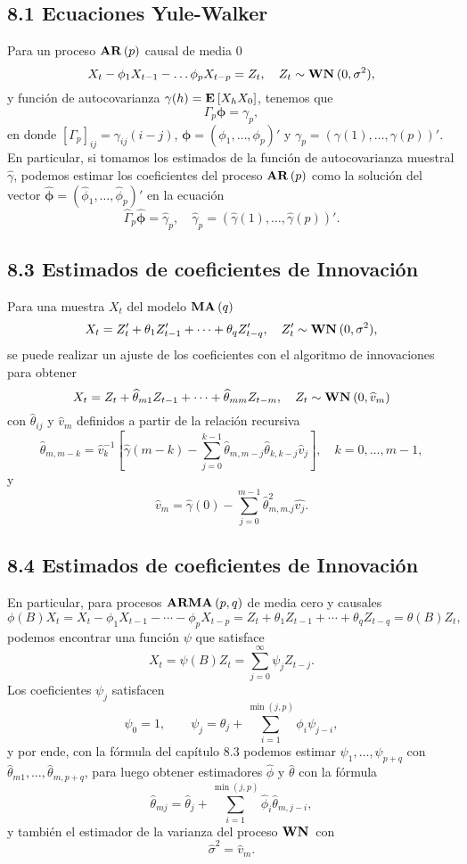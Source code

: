 \documentclass[11pt]{article}
\def\E{\ensuremath{\textbf{E\,}}}
\def\WN{\ensuremath{\textbf{WN\,}}}
\def\AR{\ensuremath{\textbf{AR\,}}}
\def\MA{\ensuremath{\textbf{MA\,}}}
\def\ARMA{\ensuremath{\textbf{ARMA\,}}}
\theoremstyle{definition}
\newcommand\wh[1]{\widehat{#1}}
\begin{document}
\subsection*{8.1 Ecuaciones Yule-Walker}

Para un proceso $\AR(p)$ causal de media 0
\[ X_t -\phi_1 X_{t-1} - \ldots \phi_{p} X_{t-p} = Z_t,\quad Z_t \sim \WN(0,\sigma^2), \]
y función de autocovarianza $\gamma(h) = \E[X_h X_0]$, tenemos que
\[ \Gamma_p \bm{\phi} = \gamma_p, \]
en donde $[\Gamma_p]_{ij} = \gamma_{ij}(i-j)$, $\bm{\phi} = (\phi_1,\ldots, \phi_p)'$ y $\gamma_p = (\gamma(1),\ldots, \gamma(p))'$. En particular, si tomamos los estimados de la función de autocovarianza muestral $\wh\gamma$, podemos estimar los coeficientes del proceso $\AR(p)$ como la solución del vector $\wh{\bm{\phi}} = (\wh{\phi}_1,\ldots,\wh{\phi}_p)'$ en la ecuación
\[ \wh{\Gamma}_p \wh{\bm{\phi}} = \wh{\gamma}_p,\quad \wh\gamma_p = (\wh\gamma(1),\ldots, \wh\gamma(p))'. \]


\subsection*{8.3 Estimados de coeficientes de Innovación}

Para una muestra $X_t$ del modelo $\MA(q)$
\[ X_t = Z_t' + \theta_1 Z_{t-1}' + \cdots + \theta_q Z_{t-q}',\quad Z_t' \sim \WN(0,\sigma^2), \]
se puede realizar un ajuste de los coeficientes con el algoritmo de innovaciones para obtener
\[ X_t = Z_t + \wh{\theta}_{m1} Z_{t-1} + \cdots + \wh{\theta}_{mm} Z_{t-m},\quad Z_t \sim \WN(0,\wh{v}_m) \]
con $\wh\theta_{ij}$ y $\wh{v}_m$ definidos a partir de la relación recursiva
\[ \wh{\theta}_{m,m-k} = \wh{v}_k^{-1}\left[  \wh{\gamma}(m-k) - \sum_{j = 0}^{k-1} \wh{\theta}_{m,m-j} \wh{\theta}_{k,k-j} \wh{v}_j \right],\quad k = 0,\ldots, m-1, \]
y
\[ \wh{v}_m = \wh{\gamma}(0) - \sum_{j = 0}^{m-1} \wh{\theta}_{m,m.j}^2 \wh{v_j}. \]

\subsection*{8.4 Estimados de coeficientes de Innovación}

En particular, para procesos $\ARMA(p,q)$ de media cero y causales
\[ \phi(B)X_t = X_t - \phi_{1} X_{t-1} - \cdots - \phi_p X_{t-p} = Z_t + \theta_1 Z_{t-1} + \cdots + \theta_q Z_{t-q} = \theta(B) Z_t,  \]
podemos encontrar una función $\psi$ que satisface
\[ X_t = \psi(B) Z_t = \sum_{j = 0}^{\infty} \psi_j Z_{t-j}. \]
Los coeficientes $\psi_j$ satisfacen
\[ \psi_0 = 1,\quad\quad \psi_j = \theta_j + \sum_{i = 1}^{\min(j,p)} \phi_i \psi_{j-i}, \]
y por ende, con la fórmula del capítulo 8.3 podemos estimar $\psi_1,\ldots, \psi_{p+q}$ con $\wh{\theta}_{m1},\ldots, \wh{\theta}_{m,p+q}$, para luego obtener estimadores $\wh\phi$ y $\wh\theta$ con la fórmula
\[ \wh{\theta}_{mj} = \wh\theta_j + \sum_{i = 1}^{\min(j,p)} \wh\phi_i \wh{\theta}_{m,j-i}, \]
y también el estimador de la varianza del proceso $\WN$ con
\[ \wh\sigma^2 = \wh{v}_m. \]
\end{document}
